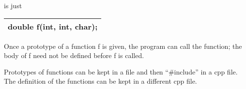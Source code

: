 \documentclass[
]{article}
\begin{document}
is just

\begin{longtable}[]{@{}l@{}}
\toprule
\endhead
double f(int, int, char);\tabularnewline
\bottomrule
\end{longtable}

Once a prototype of a function f is given, the program can call the
function; the body of f need not be defined before f is called.

Prototypes of functions can be kept in a file and then ``\#include'' in
a cpp file. The definition of the functions can be kept in a different
cpp file.
\end{document}
